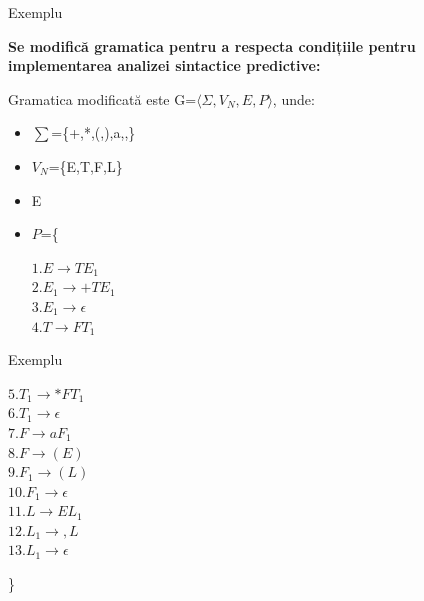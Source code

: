 \documentclass[pdf]{beamer}
\begin{document}
\begin{frame}{Exemplu}

\textbf{Se modifică gramatica pentru a respecta condițiile pentru implementarea analizei sintactice predictive:}

Gramatica modificată este G=$\langle \Sigma, V_N, E, P \rangle$, unde:

\begin{itemize}
\item
$\sum$=\{+,*,(,),a,,\}
\item
$V_N$=\{E,T,F,L\}
\item
E
\item
$P$=\{

\hspace{1cm} $1.E\rightarrow TE_1$\\
\hspace{1cm} $2.E_1\rightarrow +TE_1$\\
\hspace{1cm} $3.E_1\rightarrow \epsilon$\\
\hspace{1cm} $4.T\rightarrow FT_1$\\

\end{itemize}
\end{frame}



\begin{frame}{Exemplu}

\hspace{1cm} $5.T_1\rightarrow *FT_1$\\
\hspace{1cm} $6.T_1\rightarrow \epsilon$\\
\hspace{1cm} $7.F\rightarrow aF_1$\\
\hspace{1cm} $8.F\rightarrow (E)$\\
\hspace{1cm} $9.F_1\rightarrow (L)$\\
\hspace{1cm} $10.F_1\rightarrow \epsilon$\\
\hspace{1cm} $11.L\rightarrow EL_1$\\
\hspace{1cm} $12.L_1\rightarrow ,L$\\
\hspace{1cm} $13.L_1\rightarrow \epsilon$

\}
\end{frame}
\end{document}
